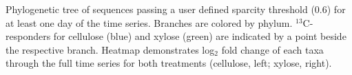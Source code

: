 Phylogenetic tree of sequences passing a user defined
sparcity threshold (0.6) for at least one day of the time series. Branches are
colored by phylum. $^{13}$C-responders for cellulose (blue) and xylose (green)
are indicated by a point beside the respective branch. Heatmap demonstrates
log$_{2}$ fold change of each taxa through the full time series for
both treatments (cellulose, left; xylose, right).        

